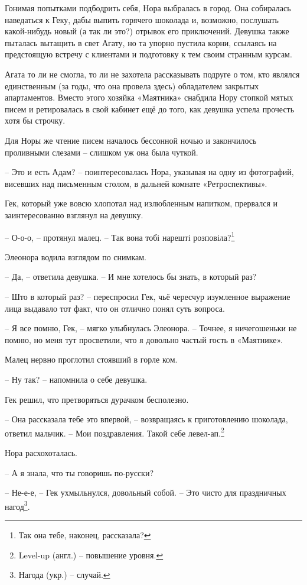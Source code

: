 \documentclass[
  a5paperpaper,
  DIV=11,
  numbers=noendperiod]{scrreprt}
\begin{document}
Гонимая попытками подбодрить себя, Нора выбралась в город. Она
собиралась наведаться к Геку, дабы выпить горячего шоколада и, возможно,
послушать какой-нибудь новый (а так ли это?) отрывок его приключений.
Девушка также пыталась вытащить в свет Агату, но та упорно пустила
корни, ссылаясь на предстоящую встречу с клиентами и подготовку к тем
своим странным курсам.

Агата то ли не смогла, то ли не захотела рассказывать подруге о том, кто
являлся единственным (за годы, что она провела здесь) обладателем
закрытых апартаментов. Вместо этого хозяйка «Маятника» снабдила Нору
стопкой мятых писем и ретировалась в свой кабинет ещё до того, как
девушка успела прочесть хотя бы строчку.

Для Норы же чтение писем началось бессонной ночью и закончилось
проливными слезами -- слишком уж она была чуткой.

-- Это и есть Адам? -- поинтересовалась Нора, указывая на одну из
фотографий, висевших над письменным столом, в дальней комнате
«Ретроспективы».

Гек, который уже вовсю хлопотал над излюбленным напитком, прервался и
заинтересованно взглянул на девушку.

-- О-о-о, -- протянул малец. -- Так вона тобі нарешті
розповіла?\footnote{Так она тебе, наконец, рассказала?}

Элеонора водила взглядом по снимкам.

-- Да, -- ответила девушка. -- И мне хотелось бы знать, в который раз?

-- Што в который раз? -- переспросил Гек, чьё чересчур изумленное
выражение лица выдавало тот факт, что он отлично понял суть вопроса.

-- Я все помню, Гек, -- мягко улыбнулась Элеонора. -- Точнее, я
ничегошеньки не помню, но меня тут просветили, что я довольно частый
гость в «Маятнике».

Малец нервно проглотил стоявший в горле ком.

-- Ну так? -- напомнила о себе девушка.

Гек решил, что претворяться дурачком бесполезно.

-- Она рассказала тебе это впервой, -- возвращаясь к приготовлению
шоколада, ответил мальчик. -- Мои поздравления. Такой себе
левел-ап.\footnote{Level-up (англ.) -- повышение уровня.}

Нора расхохоталась.

-- А я знала, что ты говоришь по-русски?

-- Не-е-е, -- Гек ухмыльнулся, довольный собой. -- Это чисто для
праздничных нагод\footnote{Нагода (укр.) -- случай.}.
\end{document}
